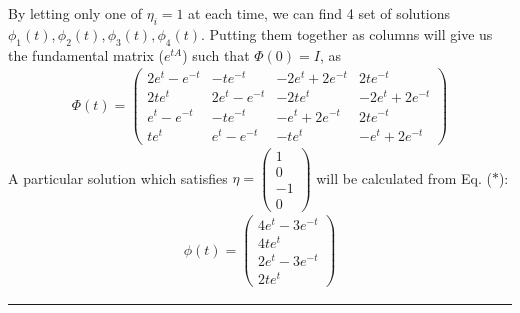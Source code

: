 \documentclass[12pt, letterpaper]{scrartcl}
\begin{document}
By letting only one of $\eta_i=1$ at each time, we can find 4 set of solutions $\phi_1(t), \phi_2(t), \phi_3(t), \phi_4(t)$. Putting them together as columns will give us the fundamental matrix ($e^{tA}$) such that $\Phi(0)=I$, as
\begin{align*}
    \Phi(t)=\left(\begin{array}{cccc}
        2e^t-e^{-t} & -te^{-t} & -2e^t+2e^{-t} & 2te^{-t} \\
        2te^t & 2e^t-e^{-t} & -2te^t & -2e^t+2e^{-t}\\
        e^t-e^{-t} & -te^{-t} & -e^t+2e^{-t} & 2te^{-t}\\
        te^t & e^t-e^{-t} & -te^t & -e^t+2e^{-t}
    \end{array}\right)
\end{align*}
A particular solution which satisfies $\eta=\left(\begin{array}{c} 1 \\ 0 \\ -1 \\ 0 \end{array}\right)$ will be calculated from Eq. ($*$):
\begin{align*}
    \phi(t)=\left(\begin{array}{c} 4e^t-3e^{-t} \\ 4te^t \\ 2e^t-3e^{-t} \\ 2te^t \end{array}\right)
\end{align*}
\vskip1mm\hrule
\end{document}
